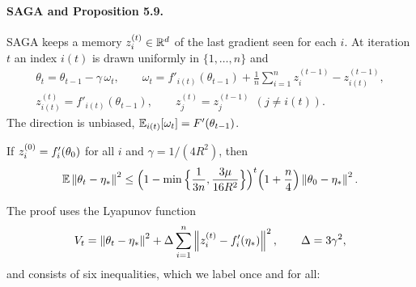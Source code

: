 \paragraph{SAGA and Proposition 5.9.}
SAGA \cite{defazio2014saga} keeps a memory $z_i^{(t)} \in \mathbb{R}^d$ of the last gradient seen for each $i$. At iteration $t$ an index
$i(t)$ is drawn uniformly in $\{1, \dots, n\}$ and
\begin{equation}\label{eq:saga}
\begin{gathered}
  \theta_t = \theta_{t-1} - \gamma\,\omega_t,\qquad
  \omega_t = f'_{i(t)}(\theta_{t-1}) + \frac1n\sum_{i=1}^n z_i^{(t-1)} - z_{i(t)}^{(t-1)},\\
  z_{i(t)}^{(t)} = f'_{i(t)}(\theta_{t-1}),\qquad z_j^{(t)} = z_j^{(t-1)}\ \ (j \ne i(t)).
\end{gathered}
\end{equation}
The direction is unbiased, $\mathbb{E}_{i(t)}[\omega_t] = F'(\theta_{t-1})$.
{\renewcommand{\thetheorem}{5.9}%
\begin{proposition}\label{prop:59}
If $z_i^{(0)} = f'_i(\theta_0)$ for all $i$ and $\gamma = 1/(4R^2)$, then
\[
  \mathbb{E}\left\|\theta_t - \eta_\ast\right\|^2 \le \Big(1 - \min\Big\{\frac{1}{3n}, \frac{3\mu}{16R^2}\Big\}\Big)^t \Big(1 + \frac n4\Big)\left\|\theta_0 - \eta_\ast\right\|^2 .
\]
\end{proposition}}\addtocounter{theorem}{-1}%
The proof uses the Lyapunov function
\begin{equation}\label{eq:lyapunov}
  V_t = \left\|\theta_t - \eta_\ast\right\|^2 + \Delta \sum_{i=1}^n \left\|z_i^{(t)} - f'_i(\eta_\ast)\right\|^2, \qquad \Delta = 3\gamma^2,
\end{equation}
and consists of six inequalities, which we label once and for all:
